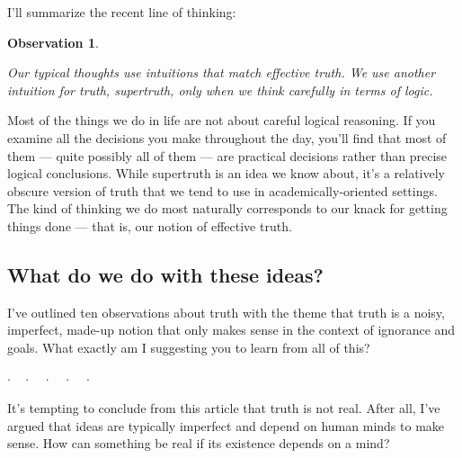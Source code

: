 \documentclass[11pt, oneside]{article}   	%
\newtheorem{obs}{Observation}
\newcommand{\dotq}{\cdot\quad}
\newcommand{\scenebreak}{
    \medskip\centerline{$\dotq\dotq\dotq\dotq\cdot$}\medskip
}
\begin{document}
I'll summarize the recent line of thinking:
\newcommand{\obsten}{
    Our typical thoughts use intuitions that match effective truth.
    We use another intuition for truth, supertruth, only when we think
    carefully in terms of logic.
}
\begin{obs}\label{o10}
    \obsten
\end{obs}
Most of the things we do in life are not about careful logical reasoning. If you
examine all the decisions you make throughout
the day, you'll find that most of them --- quite possibly all of them --- 
are practical decisions rather than precise logical conclusions.
While supertruth is an idea we know
about, it's a relatively obscure version of truth that we tend to use
in academically-oriented settings.
The kind of thinking we do most naturally corresponds to our knack for
getting things done --- that is, our notion of effective truth.


\subsection{What do we do with these ideas?}

I've outlined ten observations about truth with the theme that
truth is a noisy, imperfect, made-up notion that only makes sense in the context
of ignorance and goals. What exactly am I suggesting you to learn from all of
this?

\scenebreak

It's tempting to conclude from this article that truth is not real.
After all, I've argued that ideas are typically imperfect and depend on
human minds to make sense. How can something be real if its existence depends on
a mind?
\end{document}
